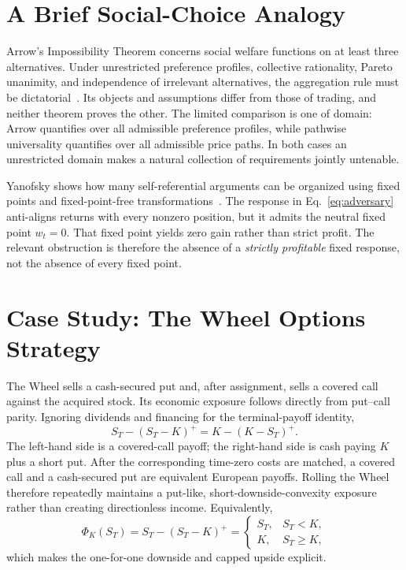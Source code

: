 \documentclass[aps,pra,reprint,superscriptaddress,amsmath,amssymb,floatfix]{revtex4-2}
\theoremstyle{plain}
\theoremstyle{definition}
\theoremstyle{remark}
\begin{document}
\section{A Brief Social-Choice Analogy}
\label{sec:arrow}

Arrow's Impossibility Theorem concerns social welfare functions on at least
three alternatives. Under unrestricted preference profiles, collective
rationality, Pareto unanimity, and independence of irrelevant alternatives,
the aggregation rule must be dictatorial~\cite{Arrow1963}. Its objects and
assumptions differ from those of trading, and neither theorem proves the
other. The limited comparison is one of domain: Arrow quantifies over all
admissible preference profiles, while pathwise universality quantifies over
all admissible price paths. In both cases an unrestricted domain makes a
natural collection of requirements jointly untenable.

Yanofsky shows how many self-referential arguments can be organized using
fixed points and fixed-point-free transformations~\cite{Yanofsky-BSL:9051621}.
The response in Eq.~\eqref{eq:adversary} anti-aligns returns with every
nonzero position, but it admits the neutral fixed point \(w_t=0\). That fixed
point yields zero gain rather than strict profit. The relevant obstruction is
therefore the absence of a \emph{strictly profitable} fixed response, not the
absence of every fixed point.

\section{Case Study: The Wheel Options Strategy}
\label{sec:wheel}

The Wheel sells a cash-secured put and, after assignment, sells a covered call
against the acquired stock. Its economic exposure follows directly from
put--call parity. Ignoring dividends and financing for the terminal-payoff
identity,
\begin{equation}
  S_T-(S_T-K)^+
  =K-(K-S_T)^+.
  \label{eq:putcall}
\end{equation}
The left-hand side is a covered-call payoff; the right-hand side is cash
paying \(K\) plus a short put. After the corresponding time-zero costs are
matched, a covered call and a cash-secured put are equivalent European
payoffs. Rolling the Wheel therefore repeatedly maintains a put-like,
short-downside-convexity exposure rather than creating directionless income.
Equivalently,
\begin{equation}
  \Phi_K(S_T)
  =S_T-(S_T-K)^+
  =
  \begin{cases}
    S_T,&S_T<K,\\
    K,&S_T\geq K,
  \end{cases}
  \label{eq:wheelpiecewise}
\end{equation}
which makes the one-for-one downside and capped upside explicit.
\end{document}
